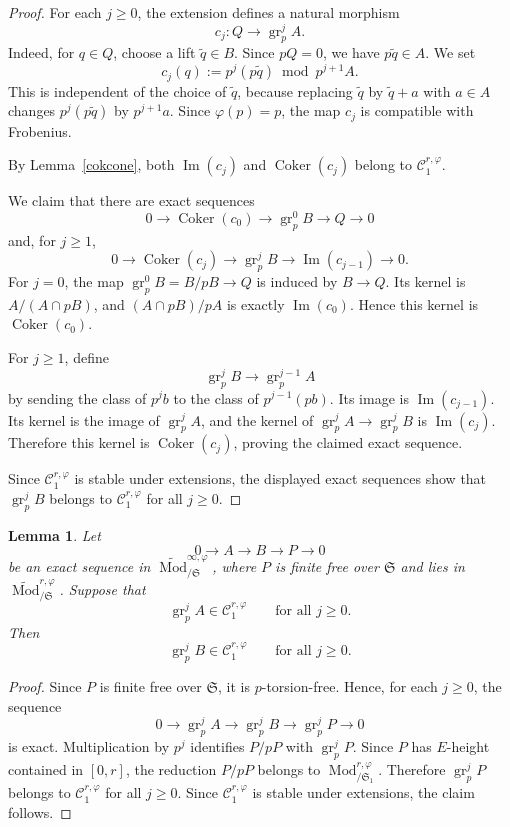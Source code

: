 \documentclass[11pt]{amsart}
\newtheorem{lemma}{Lemma}[section]
\numberwithin{equation}{section}
\newcommand{\mf}{\mathfrak}
\newcommand{\Mod}{\operatorname{Mod}}
\newcommand{\im}{\operatorname{Im}}
\newcommand{\Coker}{\operatorname{Coker}}
\newcommand{\gr}{{\operatorname{gr}}}
\newcommand{\mS}{\mf{S}}
\numberwithin{equation}{section}
\begin{document}
\begin{proof}
For each $j\geq 0$, the extension defines a natural morphism
\[
  c_j:Q\longrightarrow \gr_p^j A.
\]
Indeed, for $q\in Q$, choose a lift $\tilde q\in B$.  Since $pQ=0$, we have
$p\tilde q\in A$.  We set
\[
  c_j(q):=p^j(p\tilde q)\bmod p^{j+1}A.
\]
This is independent of the choice of $\tilde q$, because replacing
$\tilde q$ by $\tilde q+a$ with $a\in A$ changes $p^j(p\tilde q)$ by
$p^{j+1}a$.  Since $\varphi(p)=p$, the map $c_j$ is compatible with
Frobenius.

By Lemma~\ref{cokcone}, both $\im(c_j)$ and $\Coker(c_j)$ belong to
$\mathcal C_1^{r,\varphi}$.

We claim that there are exact sequences
\[
  0\longrightarrow
  \Coker(c_0)
  \longrightarrow
  \gr_p^0 B
  \longrightarrow
  Q
  \longrightarrow 0
\]
and, for $j\geq 1$,
\[
  0\longrightarrow
  \Coker(c_j)
  \longrightarrow
  \gr_p^j B
  \longrightarrow
  \im(c_{j-1})
  \longrightarrow 0.
\]
For $j=0$, the map $\gr_p^0B=B/pB\to Q$ is induced by $B\to Q$.  Its kernel
is $A/(A\cap pB)$, and $(A\cap pB)/pA$ is exactly $\im(c_0)$.  Hence this
kernel is $\Coker(c_0)$.

For $j\geq 1$, define
\[
  \gr_p^jB\longrightarrow \gr_p^{j-1}A
\]
by sending the class of $p^jb$ to the class of $p^{j-1}(pb)$.  Its image is
$\im(c_{j-1})$.  Its kernel is the image of $\gr_p^jA$, and the kernel of
$\gr_p^jA\to\gr_p^jB$ is $\im(c_j)$.  Therefore this kernel is
$\Coker(c_j)$, proving the claimed exact sequence.

Since $\mathcal C_1^{r,\varphi}$ is stable under extensions, the displayed
exact sequences show that $\gr_p^jB$ belongs to $\mathcal C_1^{r,\varphi}$
for all $j\geq 0$.
\end{proof}

\begin{lemma}\label{grpextfree}
Let
\[
  0\longrightarrow A\longrightarrow B\longrightarrow P\longrightarrow 0
\]
be an exact sequence in $\widetilde{\Mod}^{\infty,\varphi}_{/\mS}$, where $P$ is
finite free over $\mS$ and lies in $\widetilde{\Mod}^{r,\varphi}_{/\mS}$.  Suppose
that
\[
  \gr_p^j A\in\mathcal C_1^{r,\varphi}
  \qquad
  \text{for all } j\geq 0.
\]
Then
\[
  \gr_p^j B\in\mathcal C_1^{r,\varphi}
  \qquad
  \text{for all } j\geq 0.
\]
\end{lemma}

\begin{proof}
Since $P$ is finite free over $\mS$, it is $p$-torsion-free.  Hence, for
each $j\geq 0$, the sequence
\[
  0\longrightarrow
  \gr_p^j A
  \longrightarrow
  \gr_p^j B
  \longrightarrow
  \gr_p^j P
  \longrightarrow 0
\]
is exact.  Multiplication by $p^j$ identifies $P/pP$ with $\gr_p^jP$.
Since $P$ has $E$-height contained in $[0,r]$, the reduction $P/pP$ belongs
to $\Mod^{r,\varphi}_{/\mS_1}$.  Therefore $\gr_p^jP$ belongs to
$\mathcal C_1^{r,\varphi}$ for all $j\geq 0$.  Since
$\mathcal C_1^{r,\varphi}$ is stable under extensions, the claim follows.
\end{proof}
\end{document}

